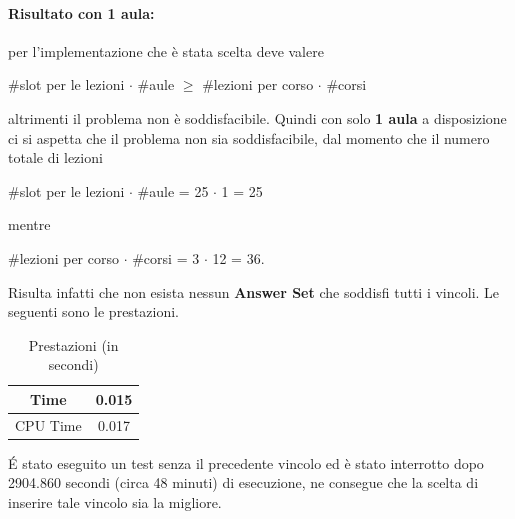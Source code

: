 \documentclass[a4paper,oneside,12pt]{book}
\begin{document}
    \paragraph{Risultato con 1 aula:}

    per l'implementazione che è stata scelta deve valere\begin{center}

                                                            \#slot per le lezioni $\cdot$ \#aule  $\ge$ \#lezioni per corso $\cdot$ \#corsi
    \end{center}
    altrimenti il problema non è soddisfacibile. Quindi con solo \textbf{1 aula} a disposizione ci si aspetta che il problema non sia soddisfacibile, dal momento che il numero totale di lezioni
    \begin{center}

        \#slot per le lezioni $\cdot$ \#aule  = 25 $\cdot$ 1 = 25\\
    \end{center}
    mentre
    \begin{center}
        \#lezioni per corso $\cdot$ \#corsi  = 3 $\cdot$ 12 = 36.\\
    \end{center}
    Risulta infatti che non esista nessun \textbf{Answer Set} che soddisfi tutti i vincoli. Le seguenti sono le prestazioni.
    \FloatBarrier
    \begin{table}[htb]
        \centering
        \begin{tabular}{|c | c|}
            \hline
            Time &0.015\\
            \hline
            CPU Time &0.017\\
            \hline
        \end{tabular}
        \caption{Prestazioni (in secondi)}
    \end{table}
    \FloatBarrier
    \noindent \'E stato eseguito un test senza il precedente vincolo ed è stato interrotto dopo 2904.860 secondi (circa 48 minuti) di esecuzione, ne consegue che la scelta di inserire tale vincolo sia la migliore.
\end{document}
